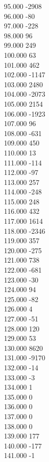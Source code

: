 { 95.000	-2908 \\
 96.000	-80 \\
 97.000	-228 \\
 98.000	96 \\
 99.000	249 \\
 100.000	63 \\
 101.000	462 \\
 102.000	-1147 \\
 103.000	2480 \\
 104.000	-2073 \\
 105.000	2154 \\
 106.000	-1923 \\
 107.000	96 \\
 108.000	-631 \\
 109.000	450 \\
 110.000	13 \\
 111.000	-114 \\
 112.000	-97 \\
 113.000	257 \\
 114.000	-248 \\
 115.000	248 \\
 116.000	432 \\
 117.000	1614 \\
 118.000	-2346 \\
 119.000	357 \\
 120.000	-275 \\
 121.000	738 \\
 122.000	-681 \\
 123.000	-30 \\
 124.000	94 \\
 125.000	-82 \\
 126.000	4 \\
 127.000	-51 \\
 128.000	120 \\
 129.000	53 \\
 130.000	8620 \\
 131.000	-9170 \\
 132.000	-14 \\
 133.000	-3 \\
 134.000	1 \\
 135.000	0 \\
 136.000	0 \\
 137.000	0 \\
 138.000	0 \\
 139.000	177 \\
 140.000	-177 \\
 141.000	-1 \\
}
